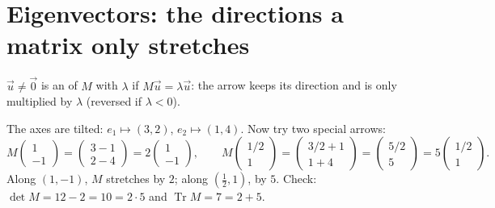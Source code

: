 \section{Eigenvectors: the directions a matrix only stretches}

\begin{defn}
$\vec u\ne\vec0$ is an  of $M$ with  $\lambda$ if $M\vec u=\lambda\vec u$: the arrow keeps its direction and is only multiplied by $\lambda$
(reversed if $\lambda<0$).
\end{defn}

\begin{example}[$M=\begin{pmatrix}3&1\\2&4\end{pmatrix}$]
The axes are tilted: $e_1\mapsto(3,2)$, $e_2\mapsto(1,4)$. Now try two special arrows:
\[ M\begin{pmatrix}1\\-1\end{pmatrix}=\begin{pmatrix}3-1\\2-4\end{pmatrix}=2\begin{pmatrix}1\\-1\end{pmatrix},\qquad
M\begin{pmatrix}1/2\\1\end{pmatrix}=\begin{pmatrix}3/2+1\\1+4\end{pmatrix}=\begin{pmatrix}5/2\\5\end{pmatrix}=5\begin{pmatrix}1/2\\1\end{pmatrix}. \]
Along $(1,-1)$, $M$ stretches by $2$; along $(\tfrac12,1)$, by $5$. Check: $\det M=12-2=10=2\cdot5$ and $\operatorname{Tr}M=7=2+5$. \checkmark
\end{example}

